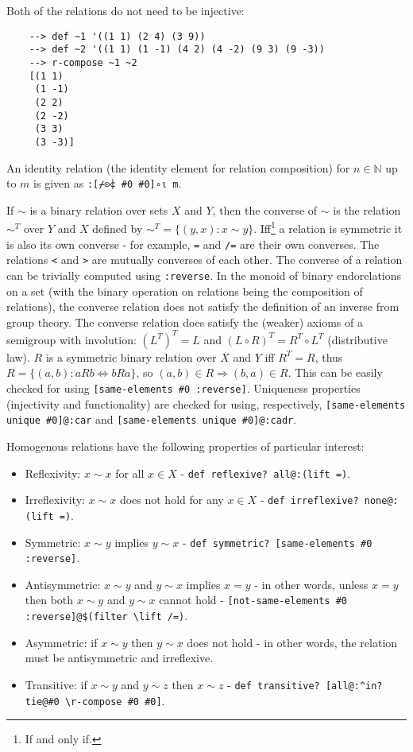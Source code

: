 Both of the relations do not need to be injective:

\begin{Verbatim}
    --> def ~1 '((1 1) (2 4) (3 9))
    --> def ~2 '((1 1) (1 -1) (4 2) (4 -2) (9 3) (9 -3))
    --> r-compose ~1 ~2
    [(1 1)
     (1 -1)
     (2 2)
     (2 -2)
     (3 3)
     (3 -3)]
\end{Verbatim}

An identity relation (the identity element for relation composition) for $n \in \mathbb{N}$ up to $m$ is given as \verb|:[⌿⊙⍧ #0 #0]∘⍳ m|.

If $\sim$ is a binary relation over sets $X$ and $Y$, then the converse of $\sim$ is the relation $\sim^T$ over $Y$ and $X$ defined by $\displaystyle \sim^T = \{(y,x):x\sim y\}$. Iff\footnote{If and only if.} a relation is symmetric it is also its own converse - for example, \verb|=| and \verb|/=| are their own converses. The relations \verb|<| and \verb|>| are mutually converses of each other. The converse of a relation can be trivially computed using \verb|:reverse|. In the monoid of binary endorelations on a set (with the binary operation on relations being the composition of relations), the converse relation does not satisfy the definition of an inverse from group theory. The converse relation does satisfy the (weaker) axioms of a semigroup with involution: $\left(L^T\right)^T=L$ and $(L\circ R)^T=R^T\circ L^T$ (distributive law). $R$ is a symmetric binary relation over $X$ and $Y$ iff $R^T = R$, thus $R = \{(a,b): a R b \Leftrightarrow b R a \}$, so $(a,b)\in R \Rightarrow (b,a)\in R$. This can be easily checked for using \verb|[same-elements #0 :reverse]|. Uniqueness properties (injectivity and functionality) are checked for using, respectively, \verb|[same-elements unique #0]@:car| and \verb|[same-elements unique #0]@:cadr|.

Homogenous relations have the following properties of particular interest:

\begin{itemize}
    \item Reflexivity: $x \sim x$ for all $x \in X$ - \verb|def reflexive? all@:(lift =)|.
    \item Irreflexivity: $x \sim x$ does not hold for any $x \in X$ - \verb|def irreflexive? none@:(lift =)|.
    \item Symmetric: $x \sim y$ implies $y \sim x$ - \verb|def symmetric? [same-elements #0 :reverse]|.
    \item Antisymmetric: $x \sim y$ and $y \sim x$ implies $x = y$ - in other words, unless $x = y$ then both $x \sim y$ and $y \sim x$ cannot hold - \verb|[not-same-elements #0 :reverse]@$(filter \lift /=)|.
    \item Asymmetric: if $x \sim y$ then $y \sim x$ does not hold - in other words, the relation must be antisymmetric and irreflexive.
    \item Transitive: if $x \sim y$ and $y \sim z$ then $x \sim z$ - \verb|def transitive? [all@:^in? tie@#0 \r-compose #0 #0]|.
\end{itemize}

